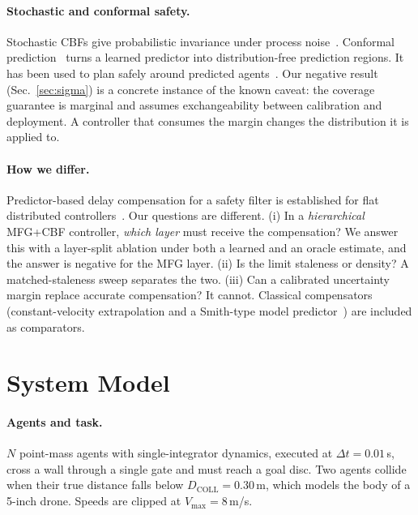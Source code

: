 \documentclass{article}
\begin{document}
\paragraph{Stochastic and conformal safety.}
Stochastic CBFs give probabilistic invariance under process noise~\cite{clark2021stochastic}.
Conformal prediction~\cite{vovk2005algorithmic,angelopoulos2023conformal} turns a learned
predictor into distribution-free prediction regions. It has been used to plan safely around
predicted agents~\cite{lindemann2023safe,dixit2023adaptive}. Our negative result
(Sec.~\ref{sec:sigma}) is a concrete instance of the known caveat: the coverage guarantee is
marginal and assumes exchangeability between calibration and deployment. A controller that
consumes the margin changes the distribution it is applied to.

\paragraph{How we differ.}
Predictor-based delay compensation for a safety filter is established for flat distributed
controllers~\cite{ballotta2025safe}. Our questions are different. (i) In a \emph{hierarchical}
MFG+CBF controller, \emph{which layer} must receive the compensation? We answer this with a
layer-split ablation under both a learned and an oracle estimate, and the answer is negative for the
MFG layer. (ii) Is the limit staleness or density? A matched-staleness sweep separates the two.
(iii) Can a calibrated uncertainty margin replace accurate compensation? It cannot. Classical compensators (constant-velocity
extrapolation and a Smith-type model predictor~\cite{smith1957closer}) are included as comparators.

\section{System Model}
\label{sec:model}

\paragraph{Agents and task.}
$N$ point-mass agents with single-integrator dynamics, executed at $\Delta t = 0.01$\,s, cross a
wall through a single gate and must reach a goal disc.
Two agents collide when their true distance falls below $D_{\mathrm{COLL}} = 0.30$\,m, which
models the body of a 5-inch drone.
Speeds are clipped at $V_{\max} = 8$\,m/s.
\end{document}
